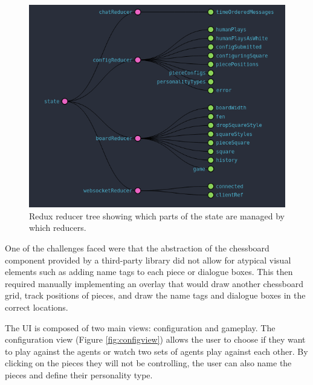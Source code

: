 \documentclass{article}
\begin{document}
\begin{figure}[!ht]
	\centering
	\includegraphics[width=\linewidth]{images/reducers}
	\caption{Redux reducer tree showing which parts of the state are managed by which reducers.}
	\label{fig:reducers}
\end{figure}

One of the challenges faced were that the abstraction of the chessboard component provided by a third-party library did not allow for atypical visual elements such as adding name tags to each piece or dialogue boxes. This then required manually implementing an overlay that would draw another chessboard grid, track positions of pieces, and draw the name tags and dialogue boxes in the correct locations. 

The UI is composed of two main views: configuration and gameplay. 
The configuration view (Figure \ref{fig:configview}) allows the user to choose if they want to play against the agents or watch two sets of agents play against each other. By clicking on the pieces they will not be controlling, the user can also name the pieces and define their personality type. 
\end{document}
